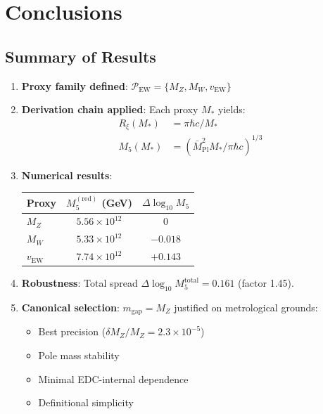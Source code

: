 \documentclass[11pt,a4paper]{article}
\newcommand{\Mpl}{\bar{M}_{\mathrm{Pl}}}
\newcommand{\Mfive}{M_5}
\newcommand{\Rxi}{R_\xi}
\newcommand{\mgap}{m_{\mathrm{gap}}}
\newcommand{\MZ}{M_Z}
\newcommand{\MW}{M_W}
\newcommand{\vEW}{v_{\mathrm{EW}}}
\newcommand{\Mstar}{M_*}
\theoremstyle{definition}
\theoremstyle{plain}
\theoremstyle{remark}
\begin{document}
\section{Conclusions}
\label{sec:conclusions}

\subsection{Summary of Results}

\begin{enumerate}
\item \textbf{Proxy family defined}: $\mathcal{P}_{\mathrm{EW}} = \{\MZ, \MW, \vEW\}$

\item \textbf{Derivation chain applied}: Each proxy $\Mstar$ yields:
\begin{align}
\Rxi(\Mstar) &= \pi\hbar c/\Mstar \label{eq:conc-Rxi} \\
\Mfive(\Mstar) &= (\Mpl^2 \Mstar / \pi\hbar c)^{1/3} \label{eq:conc-M5}
\end{align}

\item \textbf{Numerical results}:
\begin{center}
\begin{tabular}{@{}lcc@{}}
\toprule
Proxy & $\Mfive^{\mathrm{(red)}}$ (GeV) & $\Delta\log_{10}\Mfive$ \\
\midrule
$\MZ$ & $5.56 \times 10^{12}$ & 0 \\
$\MW$ & $5.33 \times 10^{12}$ & $-0.018$ \\
$\vEW$ & $7.74 \times 10^{12}$ & $+0.143$ \\
\bottomrule
\end{tabular}
\end{center}

\item \textbf{Robustness}: Total spread $\Delta\log_{10}\Mfive^{\mathrm{total}} = 0.161$ (factor 1.45).

\item \textbf{Canonical selection}: $\mgap = \MZ$ justified on metrological grounds:
\begin{itemize}
\item Best precision ($\delta\MZ/\MZ = 2.3 \times 10^{-5}$)
\item Pole mass stability
\item Minimal EDC-internal dependence
\item Definitional simplicity
\end{itemize}
\end{enumerate}
\end{document}
